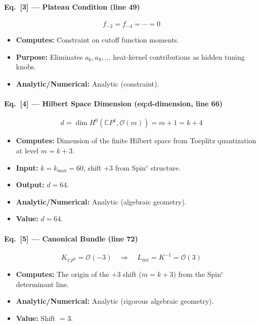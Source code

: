 \paragraph{Eq.\ [3] --- Plateau Condition (line 49)}
\[
  f_{-2} = f_{-4} = \cdots = 0
\]
\begin{itemize}
  \item \textbf{Computes:} Constraint on cutoff function moments.
  \item \textbf{Purpose:} Eliminates $a_6, a_8, \ldots$ heat-kernel contributions
        as hidden tuning knobs.
  \item \textbf{Analytic/Numerical:} Analytic (constraint).
\end{itemize}

\paragraph{Eq.\ [4] --- Hilbert Space Dimension (eq:d-dimension, line 66)}
\[
  d = \dim H^0(\mathbb{C}P^1, \mathcal{O}(m)) = m + 1 = k + 4
\]
\begin{itemize}
  \item \textbf{Computes:} Dimension of the finite Hilbert space from Toeplitz
        quantization at level $m = k+3$.
  \item \textbf{Input:} $k = k_{\max} = 60$, shift $+3$ from Spin$^c$ structure.
  \item \textbf{Output:} $d = 64$.
  \item \textbf{Analytic/Numerical:} Analytic (algebraic geometry).
  \item \textbf{Value:} $d = 64$.
\end{itemize}

\paragraph{Eq.\ [5] --- Canonical Bundle (line 72)}
\[
  K_{\mathbb{C}P^2} = \mathcal{O}(-3) \quad\Rightarrow\quad
  L_{\det} = K^{-1} = \mathcal{O}(3)
\]
\begin{itemize}
  \item \textbf{Computes:} The origin of the $+3$ shift ($m = k+3$) from the
        Spin$^c$ determinant line.
  \item \textbf{Analytic/Numerical:} Analytic (rigorous algebraic geometry).
  \item \textbf{Value:} Shift $= 3$.
\end{itemize}

